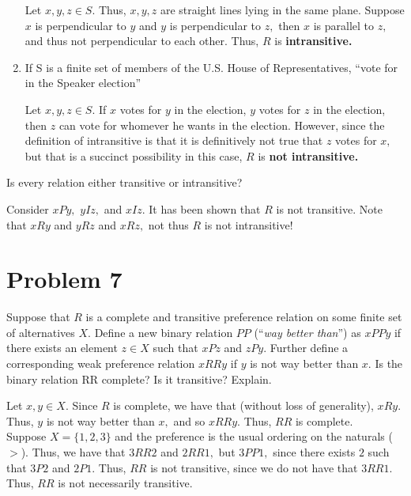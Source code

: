\documentclass[11pt]{article}
\begin{document}
\begin{enumerate}
    \begin{solution}
        Let $x,y,z \in S.$ Thus, $x,y,z$ are straight lines lying in the same plane. Suppose $x$ is perpendicular to $y$ and $y$ is perpendicular to $z,$ then $x$ is parallel to $z,$ and thus not perpendicular to each other. Thus, $R$ is \textbf{intransitive.} 
    \end{solution}
    \item 
    \begin{problem}
        If S is a finite set of members of the U.S. House of Representatives, “vote for in the
Speaker election”
    \end{problem}
    \begin{solution}
        Let $x,y,z\in S.$ If $x$ votes for $y$ in the election, $y$ votes for $z$ in the election, then $z$ can vote for whomever he wants in the election. However, since the definition of intransitive is that it is definitively not true that $z$ votes for $x,$ but that is a succinct possibility in this case, $R$ is \textbf{not  intransitive.}
    \end{solution}
\end{enumerate}
\begin{problem}
    Is every relation either transitive or intransitive? 
\end{problem}
\begin{solution}
Consider $xPy,$ $yIz,$ and $xIz.$ It has been shown that $R$ is not transitive. Note that $xRy$ and $yRz$ and $xRz,$ not thus $R$ is not intransitive!
\end{solution}

\newpage
\section*{Problem 7}
\begin{problem}
    Suppose that $R$ is a complete and transitive preference relation on some finite set of alternatives $X$. Define a new binary relation $PP$ (“\textit{way better than}”) as $xP P y$ if there exists an element $z \in X$ such that $xP z$ and $zP y$. Further define a corresponding weak preference
relation $xRRy$ if $y$ is not way better than $x$.
Is the binary relation RR complete? Is it transitive? Explain.
\end{problem}
\begin{solution}
    Let $x,y\in X.$ Since $R$ is complete, we have that (without loss of generality), $xRy.$ Thus, $y$ is not way better than $x,$ and so $xRRy.$ Thus, $RR$ is complete.\\
    
    Suppose $X = \{1,2,3\}$ and the preference is the usual ordering on the naturals ($>$). Thus, we have that $3RR2$ and $2RR1,$ but $3PP1,$ since there exists $2$ such that $3P2$ and $2P1.$ Thus, $RR$ is not transitive, since we do not have that $3RR1.$ Thus, $RR$ is not necessarily transitive.
\end{solution}
\end{document}
